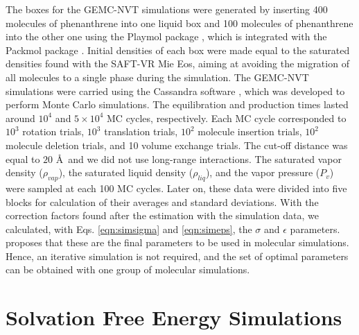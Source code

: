 The boxes for the GEMC-NVT simulations were generated by inserting 400 molecules of phenanthrene into one liquid box and 100 molecules of phenanthrene into the other one using the Playmol package \cite{playmol}, which is integrated with the Packmol package \cite{packmol}. Initial densities of each box were made equal to the saturated densities found with the SAFT-VR Mie Eos, aiming at avoiding the migration of all molecules to a single phase during the simulation. The GEMC-NVT simulations were carried using the Cassandra software \cite{doi:10.1063/1.3644939},  which was developed to perform Monte Carlo simulations. The equilibration and production times lasted around  $10^{4}$ and $5 \times 10^{4}$ MC cycles, respectively. Each MC cycle corresponded to $10^3$ rotation trials, $10^3$ translation trials, $10^2$ molecule insertion trials, $10^2$ molecule deletion trials, and 10 volume exchange trials. The cut-off distance was equal to $20$ \AA  $\,$ and we did not use long-range interactions. The saturated vapor density ($\rho_{vap}$), the saturated liquid density ($\rho_{liq}$), and the vapor pressure ($P_{v}$) were sampled at each 100 MC cycles. Later on, these data were divided into five blocks for calculation of their averages and standard deviations. With the correction factors found after the estimation with the simulation data, we calculated, with Eqs. \eqref{eqn:simsigma} and \eqref{eqn:simeps}, the $\sigma$ and $\epsilon$ parameters.  proposes that these are the final parameters to be used in molecular simulations. Hence, an iterative simulation is not required, and the set of optimal parameters can be obtained with one group of molecular simulations. 

\section{Solvation Free Energy Simulations}\label{solvme}

